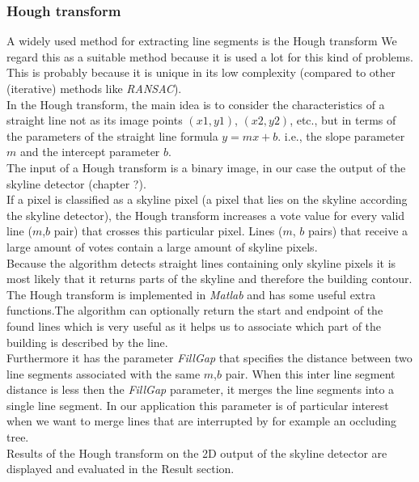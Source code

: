 \subsubsection{Hough transform}
	A widely used method for extracting line segments is the Hough transform \cite{Hough}
	We regard this as a suitable method because it is
	used a lot for this kind of problems. This is probably because it is unique
	in its low complexity (compared to other (iterative) methods like
	\emph{RANSAC}).\\
	In the Hough transform, the main idea is to consider the characteristics of a
	straight line not as its image points $(x1, y1)$, $(x2, y2)$, etc., but in
	terms of the parameters of the straight line formula $y = mx + b$. i.e., the
	slope parameter $m$ and the intercept parameter $b$.\\
	The input of a Hough transform is a binary image, in our case the output of 
	the skyline detector (chapter ?).\\
	If a pixel is classified as a skyline pixel (a pixel that lies on the
	skyline according the skyline detector), the Hough transform increases
	a vote value for every valid line ($m$,$b$ pair) that crosses this
	particular pixel.  Lines ($m$, $b$ pairs) that receive a large amount of votes
	contain a large amount of skyline pixels.\\
	Because the algorithm detects straight lines containing only skyline pixels it is
	most likely that it returns parts of the skyline and therefore the building
	contour. \\ The Hough transform is implemented in \emph{Matlab} and has
	some useful extra functions.The algorithm can optionally return the start
	and endpoint of the found lines which is very useful as it helps us to
	associate which part of the building is described by the line.\\
	Furthermore it has the parameter \emph{FillGap} that specifies the distance
	between two line segments associated with the same $m$,$b$ pair.  When this
	inter line segment distance is less then the \emph{FillGap} parameter, it
	merges the line segments into a single line segment. In our application
	this parameter is of particular interest when we want to merge lines that
	are interrupted by for example an occluding tree.\\
	Results of the Hough transform on the 2D output of the skyline detector are
	displayed and evaluated in the Result section.



